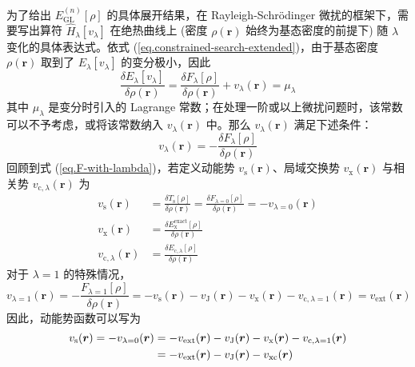 为了给出 $E_\mathrm{GL}^{(n)} [\rho]$ 的具体展开结果，在 Rayleigh-Schr\"odinger 微扰的框架下，需要写出算符 $\hat H_\lambda [v_\lambda]$ 在绝热曲线上 (密度 $\rho(\bm{r})$ 始终为基态密度的前提下) 随 $\lambda$ 变化的具体表达式。依式 (\ref{eq.constrained-search-extended})，由于基态密度 $\rho(\bm{r})$ 取到了 $E_\lambda[v_\lambda]$ 的变分极小，因此
\begin{equation*}
  \frac{\delta E_\lambda[v_\lambda]}{\delta \rho(\bm{r})} = \frac{\delta F_\lambda [\rho]}{\delta \rho(\bm{r})} + v_{\lambda}(\bm{r}) = \mu_\lambda
\end{equation*}
其中 $\mu_\lambda$ 是变分时引入的 Lagrange 常数；在处理一阶或以上微扰问题时，该常数可以不予考虑，或将该常数纳入 $v_\lambda(\bm{r})$ 中。那么 $v_\lambda(\bm{r})$ 满足下述条件：
\begin{equation}
  v_\lambda(\bm{r}) = - \frac{\delta F_\lambda [\rho]}{\delta \rho(\bm{r})}
\end{equation}
回顾到式 (\ref{eq.F-with-lambda})，若定义动能势 $v_\mathrm{s} (\bm{r})$、局域交换势 $v_\mathrm{x} (\bm{r})$ 与相关势 $v_{\mathrm{c}, \lambda} (\bm{r})$ 为
\begin{align}
  v_\mathrm{s}(\bm{r}) &= \frac{\delta T_\mathrm{s} [\rho]}{\delta \rho(\bm{r})} = \frac{\delta F_{\lambda=0} [\rho]}{\delta \rho(\bm{r})} = - v_{\lambda=0}(\bm{r}) \\
  v_\mathrm{x} (\bm{r}) &= \frac{\delta E_\mathrm{x}^\mathrm{exact} [\rho]}{\delta \rho(\bm{r})} \\
  \label{eq.v-c-lambda}
  v_{\mathrm{c}, \lambda} (\bm{r}) &= \frac{\delta E_{\mathrm{c}, \lambda} [\rho]}{\delta \rho(\bm{r})}
\end{align}
对于 $\lambda = 1$ 的特殊情况，
\begin{equation}
  v_{\lambda=1}(\bm{r}) = - \frac{F_{\lambda=1} [\rho]}{\delta \rho(\bm{r})} = - v_\mathrm{s}(\bm{r}) - v_\mathrm{J}(\bm{r}) - v_\mathrm{x}(\bm{r}) - v_{\mathrm{c}, \lambda=1}(\bm{r}) = v_\mathrm{ext}(\bm{r})
\end{equation}
因此，动能势函数可以写为
\begin{align}
  v_\mathrm{s}(\bm{r}) = - v_{\lambda=0} (\bm{r}) &= - v_\mathrm{ext}(\bm{r}) - v_\mathrm{J}(\bm{r}) - v_\mathrm{x}(\bm{r}) - v_{\mathrm{c}, \lambda=1}(\bm{r}) \notag\\
  &= - v_\mathrm{ext}(\bm{r}) - v_\mathrm{J}(\bm{r}) - v_\mathrm{xc}(\bm{r})
\end{align}

